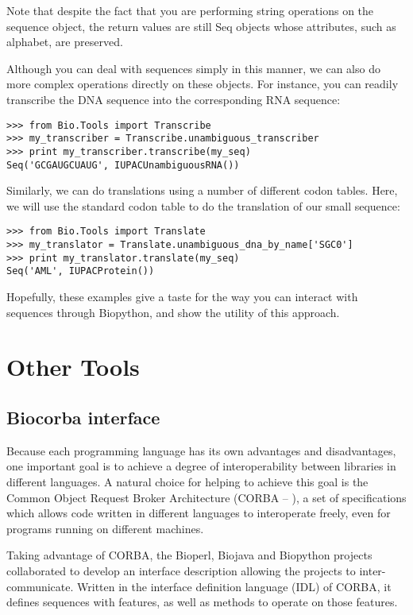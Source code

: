 \documentclass[dvips]{article}
\begin{document}
Note that despite the fact that you are performing string operations on the sequence object, the return values are still Seq objects whose attributes, such as alphabet, are preserved.


Although  you can deal with sequences simply in this manner, we can also do more complex operations directly on these objects. For instance, you can readily transcribe the DNA sequence into the corresponding RNA sequence:

\begin{verbatim}
>>> from Bio.Tools import Transcribe
>>> my_transcriber = Transcribe.unambiguous_transcriber
>>> print my_transcriber.transcribe(my_seq)
Seq('GCGAUGCUAUG', IUPACUnambiguousRNA())
\end{verbatim}

Similarly, we can do translations using a number of different codon tables. Here, we will use the standard codon table to do the translation of our small sequence:

\begin{verbatim}
>>> from Bio.Tools import Translate
>>> my_translator = Translate.unambiguous_dna_by_name['SGC0']
>>> print my_translator.translate(my_seq)
Seq('AML', IUPACProtein())
\end{verbatim}

Hopefully, these examples give a taste for the way you can interact with sequences through Biopython, and show the utility of this approach.

\section{Other Tools}


\subsection{Biocorba interface}


Because each programming language has its own advantages and disadvantages, one important goal is to achieve a degree of interoperability between libraries in different languages. A natural choice for helping to achieve this goal is the Common Object Request Broker Architecture (CORBA -- ), a set of specifications which allows code written in different languages to interoperate freely, even for programs running on different machines.


Taking advantage of CORBA, the Bioperl, Biojava and Biopython projects collaborated to develop an interface description allowing the projects to inter-communicate. Written in the interface definition language (IDL) of CORBA, it defines sequences with features, as well as methods to operate on those features.
\end{document}
